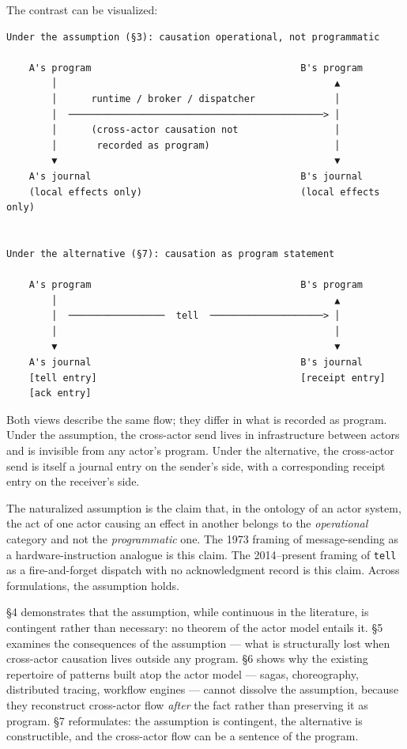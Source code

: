 \documentclass[
]{article}
\let\origtexttt\texttt%
\renewcommand{\texttt}[1]{\origtexttt{\seqsplit{#1}}}%
\let\texttt\origtexttt%
\begin{document}
The contrast can be visualized:

\begin{verbatim}
Under the assumption (§3): causation operational, not programmatic

    A's program                                     B's program
        │                                                 ▲
        │      runtime / broker / dispatcher              │
        │  ─────────────────────────────────────────────> │
        │      (cross-actor causation not                 │
        │       recorded as program)                      │
        ▼                                                 ▼
    A's journal                                     B's journal
    (local effects only)                            (local effects only)


Under the alternative (§7): causation as program statement

    A's program                                     B's program
        │                                                 ▲
        │  ─────────────────  tell  ────────────────────> │
        │                                                 │
        ▼                                                 ▼
    A's journal                                     B's journal
    [tell entry]                                    [receipt entry]
    [ack entry]
\end{verbatim}

Both views describe the same flow; they differ in what is recorded as
program. Under the assumption, the cross-actor send lives in
infrastructure between actors and is invisible from any actor's program.
Under the alternative, the cross-actor send is itself a journal entry on
the sender's side, with a corresponding receipt entry on the receiver's
side.

The naturalized assumption is the claim that, in the ontology of an
actor system, the act of one actor causing an effect in another belongs
to the \emph{operational} category and not the \emph{programmatic} one.
The 1973 framing of message-sending as a hardware-instruction analogue
is this claim. The 2014--present framing of \texttt{tell} as a
fire-and-forget dispatch with no acknowledgment record is this claim.
Across formulations, the assumption holds.

§4 demonstrates that the assumption, while continuous in the literature,
is contingent rather than necessary: no theorem of the actor model
entails it. §5 examines the consequences of the assumption --- what is
structurally lost when cross-actor causation lives outside any program.
§6 shows why the existing repertoire of patterns built atop the actor
model --- sagas, choreography, distributed tracing, workflow engines ---
cannot dissolve the assumption, because they reconstruct cross-actor
flow \emph{after} the fact rather than preserving it as program. §7
reformulates: the assumption is contingent, the alternative is
constructible, and the cross-actor flow can be a sentence of the
program.
\end{document}
